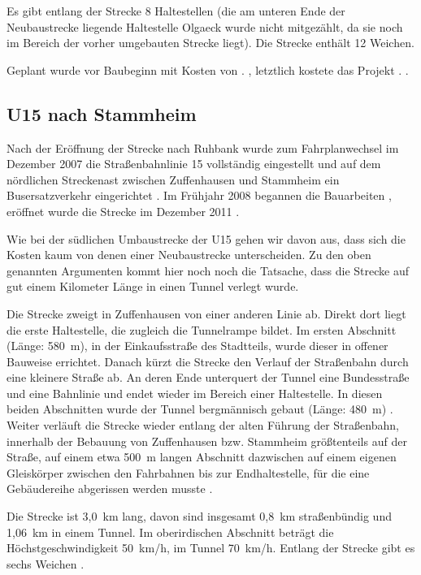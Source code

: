 Es gibt entlang der Strecke 8 Haltestellen \cite{u15splan} (die am unteren Ende
der Neubaustrecke liegende Haltestelle Olgaeck wurde nicht mitgezählt, da sie
noch im Bereich der vorher umgebauten Strecke liegt). Die Strecke enthält 12
Weichen.

Geplant wurde vor Baubeginn mit Kosten von . \cite{u15vorinfo},
letztlich kostete das Projekt . \cite{u15seb}.

\subsection*{U15 nach Stammheim}

Nach der Eröffnung der Strecke nach Ruhbank wurde zum Fahrplanwechsel im
Dezember 2007 die Straßenbahnlinie 15 vollständig eingestellt und auf dem
nördlichen Streckenast zwischen Zuffenhausen und Stammheim ein Busersatzverkehr
eingerichtet \cite{u15sv}.  Im Frühjahr 2008 begannen die Bauarbeiten
\cite{u15seb}, eröffnet wurde die Strecke im Dezember 2011 \cite{u15sv}.

Wie bei der südlichen Umbaustrecke der U15 gehen wir davon aus, dass sich die
Kosten kaum von denen einer Neubaustrecke unterscheiden. Zu den oben genannten
Argumenten kommt hier noch noch die Tatsache, dass die Strecke auf gut einem
Kilometer Länge in einen Tunnel verlegt wurde.

Die Strecke zweigt in Zuffenhausen von einer anderen Linie ab. Direkt dort liegt die erste Haltestelle, die zugleich die Tunnelrampe bildet. Im ersten Abschnitt (Länge: 580{\ }m), in der Einkaufsstraße des Stadtteils, wurde dieser in offener Bauweise errichtet.
Danach kürzt die Strecke den Verlauf der Straßenbahn durch eine kleinere Straße ab. An deren Ende unterquert der Tunnel eine Bundesstraße und eine Bahnlinie und endet wieder im Bereich einer Haltestelle. In diesen beiden Abschnitten wurde der Tunnel bergmännisch gebaut (Länge: 480{\ m}) \cite{u15mail} \cite{u15sv} \cite{u15nplan}.
Weiter verläuft die Strecke wieder entlang der alten Führung der Straßenbahn, innerhalb der Bebauung von Zuffenhausen bzw. Stammheim größtenteils auf der Straße, auf einem etwa 500{\ }m langen Abschnitt dazwischen auf einem eigenen Gleiskörper zwischen den Fahrbahnen \cite{u15nplan} bis zur Endhaltestelle, für die eine Gebäudereihe abgerissen werden musste \cite{u15sv}.

Die Strecke ist 3,0{\ }km lang, davon sind insgesamt 0,8{\ }km straßenbündig und 1,06{\ }km in einem Tunnel.
Im oberirdischen Abschnitt beträgt die Höchstgeschwindigkeit 50{\ }km/h, im Tunnel 70{\ }km/h.
Entlang der Strecke gibt es sechs Weichen \cite{u15mail}.


